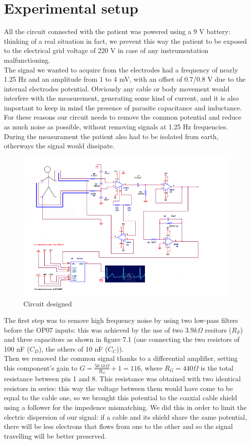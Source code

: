 \section{Experimental setup}
All the circuit connected with the patient was powered using a 9 V battery: thinking of a real situation in fact, we prevent this way the patient to be exposed to the electrical grid voltage of 220 V in case of any instrumentation malfunctioning.\\
The signal we wanted to acquire from the electrodes had a frequency of nearly 1.25 Hz and an amplitude from 1 to 4 mV, with an offset of 0.7/0.8 V due to the internal electrodes potential. Obviously any cable or body movement would interfere with the measurement, generating some kind of current, and it is also important to keep in mind the presence of parasite capacitance and inductance. For these reasons our circuit needs to remove the common potential and reduce as much noise as possible, without removing signals at 1.25 Hz frequencies.\\
During the measurament the patient also had to be isolated from earth, otherways the signal would dissipate.\\
\begin{figure}[H]
\centering
\includegraphics[width=.8\textwidth]{8/circuit.png}
\caption{Circuit designed}
\end{figure}
The  first step was to remove high frequency noise by using two low-pass filters before the OP07 inputs: this was achieved by the use of two $3.9 k\Omega$ resitors ($R_F$) and three capacitors as shown in figure 7.1 (one connecting the two resistors of 100 nF ($C_D$), the others of 10 nF ($C_C$)).\\
Then we removed the common signal thanks to a differential amplifier, setting this component's gain to $G =   \frac{50.1 k\Omega}{R_G} + 1 = 116$, where $R_G = 440 \Omega$ is the total resistance between pin 1 and 8. This resistance was obtained with two identical resistors in series: this way the voltage between them would have come to be equal to the cable one, so we brought this potential to the coaxial cable shield using a follower for the impedence mismatching. We did this in order to limit the electric dispersion of our signal: if a cable and its shield share the same potential, there will be less electrons that flows from one to the other and so the signal travelling will be better preserved.\\
